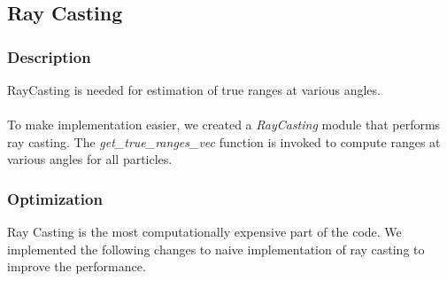\documentclass[12pt, a4paper]{article}
\begin{document}
\subsection{Ray Casting}
\subsubsection{Description}
RayCasting is needed for estimation of true ranges at various angles.\\\\ 
To make implementation easier, we created a \textit{RayCasting} module that performs ray casting. The \textit{get\_true\_ranges\_vec} function is invoked to compute ranges at various angles for all particles.
\subsubsection{Optimization}
Ray Casting is the most computationally expensive part of the code. We implemented the following changes to naive implementation of ray casting to improve the performance.
\end{document}
